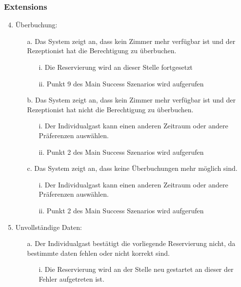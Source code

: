 \documentclass[./detailed_overview_usecases.tex]{subfiles}
\begin{document}
    \subsubsection*{Extensions}
    \begin{enumerate}
        \setcounter{enumi}{3}
        \item Überbuchung: \begin{itemize}
                       \item[a.] Das System zeigt an, dass kein Zimmer mehr verfügbar ist und der Rezeptionist hat die Berechtigung zu überbuchen.
                       \begin{itemize}
                           \item[i.] Die Reservierung wird an dieser Stelle fortgesetzt
                           \item[ii.] Punkt 9 des Main Success Szenarios wird aufgerufen
                       \end{itemize}
                       \item[b.] Das System zeigt an, dass kein Zimmer mehr verfügbar ist und der Rezeptionist hat nicht die Berechtigung zu überbuchen.
                       \begin{itemize}
                           \item[i.] Der Individualgast kann einen anderen Zeitraum oder andere Präferenzen auswählen.
                           \item[ii.] Punkt 2 des Main Success Szenarios wird aufgerufen
                       \end{itemize}
                       \item[c.] Das System zeigt an, dass keine Überbuchungen mehr möglich sind.
                       \begin{itemize}
                           \item[i.] Der Individualgast kann einen anderen Zeitraum oder andere Präferenzen auswählen.
                           \item[ii.] Punkt 2 des Main Success Szenarios wird aufgerufen
                       \end{itemize}
        \end{itemize}
        \setcounter{enumi}{7}
        \item Unvollständige Daten: \begin{itemize}
                               \item[a.] Der Individualgast bestätigt die vorliegende Reservierung nicht, da bestimmte daten fehlen oder nicht korrekt sind.
                               \begin{itemize}
                                   \item[i.] Die Reservierung wird an der Stelle neu gestartet an dieser der Fehler aufgetreten ist.
                               \end{itemize}
        \end{itemize}
    \end{enumerate}
\end{document}
